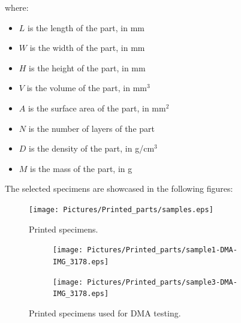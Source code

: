 \documentclass{article}
\begin{document}
        where: 

        \begin{itemize}
            \item $L$ is the length of the part, in mm
            \item $W$ is the width of the part, in mm
            \item $H$ is the height of the part, in mm
            \item $V$ is the volume of the part, in mm$^3$
            \item $A$ is the surface area of the part, in mm$^2$
            \item $N$ is the number of layers of the part
            \item $D$ is the density of the part, in g/cm$^3$
            \item $M$ is the mass of the part, in g
        \end{itemize}



        The selected specimens are showcased in the following figures: 

        \begin{figure}[h!]
            \centering
            \texttt{[image: Pictures/Printed\_parts/samples.eps]}
            \caption{Printed specimens.}
            \label{fig:printed_specimens}
        \end{figure}

        \begin{figure}[h!]
            \centering
            \begin{subfigure}[a]{0.55\textwidth}
                \texttt{[image: Pictures/Printed\_parts/sample1-DMA-IMG\_3178.eps]}
            \end{subfigure}
                \vfill
            
            \begin{subfigure}[b]{0.5\textwidth}
                \centering
                \texttt{[image: Pictures/Printed\_parts/sample3-DMA-IMG\_3178.eps]}
                \end{subfigure}
            \caption{Printed specimens used for DMA testing.}
            \label{fig:printed_specimens_DMA}
        \end{figure}
\end{document}
